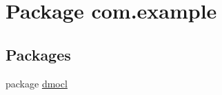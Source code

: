 \hypertarget{namespacecom_1_1example}{}\section{Package com.\+example}
\label{namespacecom_1_1example}
\subsection*{Packages}
\begin{DoxyCompactItemize}
\item 
package \mbox{\hyperlink{namespacecom_1_1example_1_1dmocl}{dmocl}}
\end{DoxyCompactItemize}
